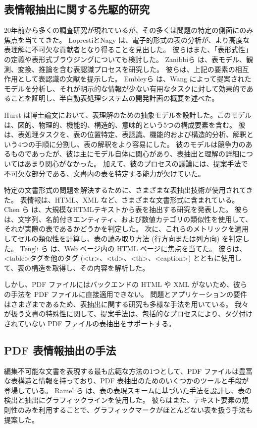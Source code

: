 \documentclass[uplatex, twocolumn,10pt]{jsarticle}
\begin{document}
\subsection{表情報抽出に関する先駆的研究}
20年前から多くの調査研究が現れているが、その多くは問題の特定の側面にのみ焦点を当ててきた。
LoprestiとNagy \cite{bib03} は、電子的形式の表の分析が、より高度な表理解に不可欠な貢献者となり得ることを見出した。
彼らはまた、「表形式性」の定義や表形式ブラウジングについても検討した。
Zanibbiら \cite{bib04} は、表モデル、観測、変換、推論を含む表認識プロセスを研究した。
彼らは、上記の要素の相互作用として表認識の文献を提示した。
Embleyら \cite{bib05} は、Wang \cite{bib06} によって提案されたモデルを分析し、それが明示的な情報が少ない有用なタスクに対して効果的であることを証明し、半自動表処理システムの開発計画の概要を述べた。

Hurst \cite{bib07} は博士論文において、表理解のための抽象モデルを設計した。このモデルは、図的、物理的、機能的、構造的、意味的という5つの構成要素を含む。
彼 \cite{bib08} は、表処理タスクを、表の位置特定、表認識、機能的および構造的分析、解釈という4つの手順に分割し、表の解釈をより容易にした。
彼のモデルは競争力のあるものであったが、彼は主にモデル自体に関心があり、表抽出と理解の詳細についてはあまり関心がなかった。
加えて、彼のプロセスの議論には、提案手法で不可欠な部分である、文書内の表を特定する能力が欠けていた。

特定の文書形式の問題を解決するために、さまざまな表抽出技術が使用されてきた。
表情報は、HTML、XML など、さまざまな文書形式に含まれている。
Chen ら \cite{bib09} は、大規模なHTMLテキストから表を抽出する研究を発表した。
彼らは、文字列、名前付きエンティティ、および数値カテゴリの類似性を使用して、それが実際の表であるかどうかを判定した。
次に、これらのメトリックを適用してセルの類似性を計算し、表の読み取り方法 (行方向または列方向) を判定した。
Tengli ら \cite{bib10} は、Web ページ内の HTML ページに焦点を当てた。
彼らは、<table>タグを他のタグ (<tr>、<td>、<th>、<caption>) とともに使用して、表の構造を取得し、その内容を解析した。

しかし、PDF ファイルにはバックエンドの HTML や XML がないため、彼らの手法を PDF ファイルに直接適用できない。
問題とアプリケーションの要件はさまざまであるため、表抽出に関する研究も多様な手法を用いている。
我々が扱う文書の特殊性に関して、提案手法は、包括的なプロセスにより、タグ付けされていない PDF ファイルの表抽出をサポートする。

\subsection{PDF 表情報抽出の手法}
編集不可能な文書を表現する最も広範な方法の1つとして、PDF ファイルは豊富な表構造と情報を持っており、PDF 表抽出のためのいくつかのツールと手段が登場している。
Ramel ら \cite{bib02} は、表の表現スキームに基づいた手法を設計し、表の検出と抽出にグラフィックラインを使用した。
彼らはまた、テキスト要素の規則性のみを利用することで、グラフィックマークがほとんどない表を扱う手法も提案した。
\end{document}
